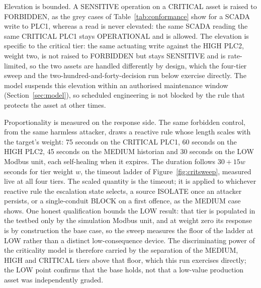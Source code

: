 Elevation is bounded. A SENSITIVE operation on a CRITICAL asset is raised to FORBIDDEN, as the grey cases of Table~\ref{tab:conformance} show for a SCADA write to PLC1, whereas a read is never elevated: the same SCADA reading the same CRITICAL PLC1 stays OPERATIONAL and is allowed. The elevation is specific to the critical tier: the same actuating write against the HIGH PLC2, weight two, is not raised to FORBIDDEN but stays SENSITIVE and is rate-limited, so the two assets are handled differently by design, which the four-tier sweep and the two-hundred-and-forty-decision run below exercise directly. The model suspends this elevation within an authorised maintenance window (Section~\ref{sec:model}), so scheduled engineering is not blocked by the rule that protects the asset at other times.

Proportionality is measured on the response side. The same forbidden control, from the same harmless attacker, draws a reactive rule whose length scales with the target's weight: 75 seconds on the CRITICAL PLC1, 60 seconds on the HIGH PLC2, 45 seconds on the MEDIUM historian and 30 seconds on the LOW Modbus unit, each self-healing when it expires. The duration follows $30 + 15w$ seconds for tier weight $w$, the timeout ladder of Figure~\ref{fig:critsweep}, measured live at all four tiers. The scaled quantity is the timeout; it is applied to whichever reactive rule the escalation state selects, a source ISOLATE once an attacker persists, or a single-conduit BLOCK on a first offence, as the MEDIUM case shows. One honest qualification bounds the LOW result: that tier is populated in the testbed only by the simulation Modbus unit, and at weight zero its response is by construction the base case, so the sweep measures the floor of the ladder at LOW rather than a distinct low-consequence device. The discriminating power of the criticality model is therefore carried by the separation of the MEDIUM, HIGH and CRITICAL tiers above that floor, which this run exercises directly; the LOW point confirms that the base holds, not that a low-value production asset was independently graded.

